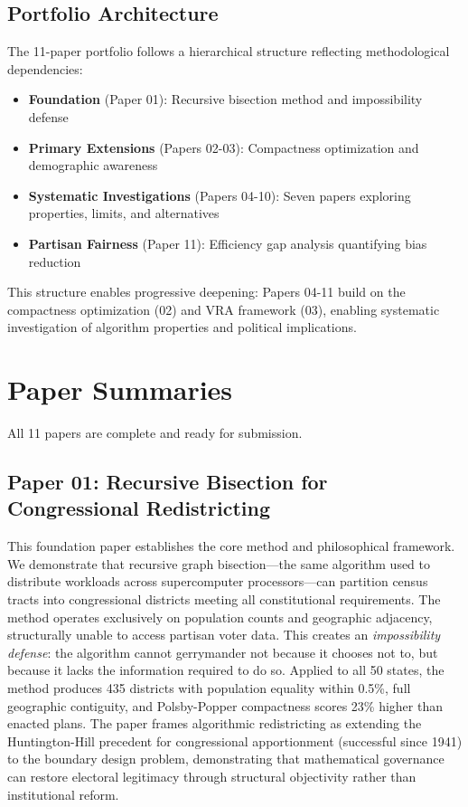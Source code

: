 \documentclass[11pt]{article}
\begin{document}
\subsection*{Portfolio Architecture}

The 11-paper portfolio follows a hierarchical structure reflecting methodological dependencies:

\begin{itemize}[leftmargin=*,noitemsep,topsep=4pt]
    \item \textbf{Foundation} (Paper 01): Recursive bisection method and impossibility defense
    \item \textbf{Primary Extensions} (Papers 02-03): Compactness optimization and demographic awareness
    \item \textbf{Systematic Investigations} (Papers 04-10): Seven papers exploring properties, limits, and alternatives
    \item \textbf{Partisan Fairness} (Paper 11): Efficiency gap analysis quantifying bias reduction
\end{itemize}

This structure enables progressive deepening: Papers 04-11 build on the compactness optimization (02) and VRA framework (03), enabling systematic investigation of algorithm properties and political implications.

\section*{Paper Summaries}

All 11 papers are complete and ready for submission.

\subsection*{Paper 01: Recursive Bisection for Congressional Redistricting}

This foundation paper establishes the core method and philosophical framework. We demonstrate that recursive graph bisection---the same algorithm used to distribute workloads across supercomputer processors---can partition census tracts into congressional districts meeting all constitutional requirements. The method operates exclusively on population counts and geographic adjacency, structurally unable to access partisan voter data. This creates an \emph{impossibility defense}: the algorithm cannot gerrymander not because it chooses not to, but because it lacks the information required to do so. Applied to all 50 states, the method produces 435 districts with population equality within 0.5\%, full geographic contiguity, and Polsby-Popper compactness scores 23\% higher than enacted plans. The paper frames algorithmic redistricting as extending the Huntington-Hill precedent for congressional apportionment (successful since 1941) to the boundary design problem, demonstrating that mathematical governance can restore electoral legitimacy through structural objectivity rather than institutional reform.
\end{document}
